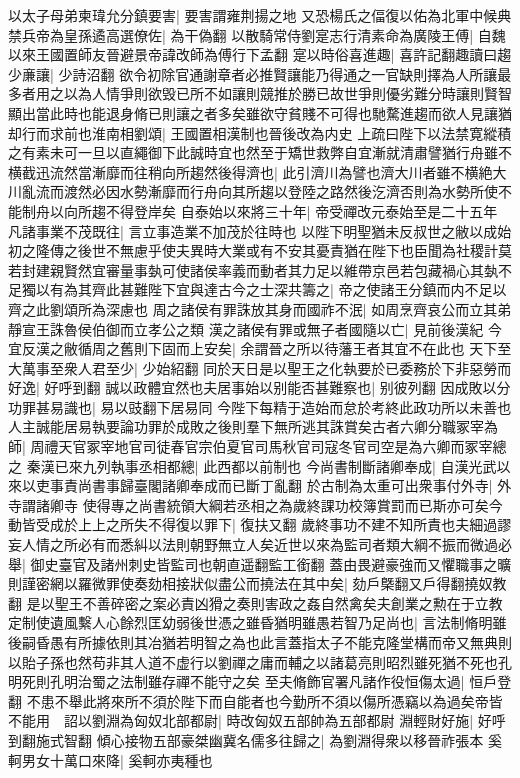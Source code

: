 以太子母弟柬瑋允分鎮要害|{
	要害謂雍荆揚之地}
又恐楊氏之偪復以佑為北軍中候典禁兵帝為皇孫遹高選僚佐|{
	為干偽翻}
以散騎常侍劉寔志行清素命為廣陵王傅|{
	自魏以來王國置師友晉避景帝諱改師為傅行下孟翻}
寔以時俗喜進趣|{
	喜許記翻趣讀曰趨}
少亷讓|{
	少詩沼翻}
欲令初除官通謝章者必推賢讓能乃得通之一官缺則擇為人所讓最多者用之以為人情爭則欲毁已所不如讓則競推於勝已故世爭則優劣難分時讓則賢智顯出當此時也能退身脩已則讓之者多矣雖欲守貧賤不可得也馳騖進趨而欲人見讓猶却行而求前也淮南相劉頌|{
	王國置相漢制也晉後改為内史}
上疏曰陛下以法禁寛縱積之有素未可一旦以直繩御下此誠時宜也然至于矯世救弊自宜漸就清肅譬猶行舟雖不横截迅流然當漸靡而往稍向所趨然後得濟也|{
	此引濟川為譬也濟大川者雖不横絶大川亂流而渡然必因水勢漸靡而行舟向其所趨以登陸之路然後汔濟否則為水勢所使不能制舟以向所趨不得登岸矣}
自泰始以來將三十年|{
	帝受禪改元泰始至是二十五年}
凡諸事業不茂既往|{
	言立事造業不加茂於往時也}
以陛下明聖猶未反叔世之敝以成始初之隆傳之後世不無慮乎使夫異時大業或有不安其憂責猶在陛下也臣聞為社稷計莫若封建親賢然宜審量事埶可使諸侯率義而動者其力足以維帶京邑若包藏禍心其埶不足獨以有為其齊此甚難陛下宜與達古今之士深共籌之|{
	帝之使諸王分鎮而内不足以齊之此劉頌所為深慮也}
周之諸侯有罪誅放其身而國祚不泯|{
	如周烹齊哀公而立其弟靜宣王誅魯侯伯御而立孝公之類}
漢之諸侯有罪或無子者國隨以亡|{
	見前後漢紀}
今宜反漢之敝循周之舊則下固而上安矣|{
	余謂晉之所以待藩王者其宜不在此也}
天下至大萬事至衆人君至少|{
	少始紹翻}
同於天日是以聖王之化執要於已委務於下非惡勞而好逸|{
	好呼到翻}
誠以政體宜然也夫居事始以别能否甚難察也|{
	别彼列翻}
因成敗以分功罪甚易識也|{
	易以豉翻下居易同}
今陛下每精于造始而怠於考終此政功所以未善也人主誠能居易執要論功罪於成敗之後則羣下無所逃其誅賞矣古者六卿分職冢宰為師|{
	周禮天官冢宰地官司徒春官宗伯夏官司馬秋官司寇冬官司空是為六卿而冢宰總之}
秦漢已來九列執事丞相都總|{
	此西都以前制也}
今尚書制斷諸卿奉成|{
	自漢光武以來以吏事責尚書事歸臺閣諸卿奉成而已斷丁亂翻}
於古制為太重可出衆事付外寺|{
	外寺謂諸卿寺}
使得專之尚書統領大綱若丞相之為歲終課功校簿賞罰而已斯亦可矣今動皆受成於上上之所失不得復以罪下|{
	復扶又翻}
歲終事功不建不知所責也夫細過謬妄人情之所必有而悉糾以法則朝野無立人矣近世以來為監司者類大綱不振而微過必舉|{
	御史臺官及諸州刺史皆監司也朝直遥翻監工銜翻}
蓋由畏避豪強而又懼職事之曠則謹密網以羅微罪使奏劾相接狀似盡公而撓法在其中矣|{
	劾戶槩翻又戶得翻撓奴教翻}
是以聖王不善碎密之案必責凶猾之奏則害政之姦自然禽矣夫創業之勲在于立教定制使遺風繫人心餘烈匡幼弱後世憑之雖昏猶明雖愚若智乃足尚也|{
	言法制脩明雖後嗣昏愚有所據依則其冶猶若明智之為也此言蓋指太子不能克隆堂構而帝又無典則以貽子孫也然苟非其人道不虚行以劉禪之庸而輔之以諸葛亮則昭烈雖死猶不死也孔明死則孔明治蜀之法制雖存禪不能守之矣}
至夫脩飾官署凡諸作役恒傷太過|{
	恒戶登翻}
不患不舉此將來所不須於陛下而自能者也今勤所不須以傷所憑竊以為過矣帝皆不能用　詔以劉淵為匈奴北部都尉|{
	時改匈奴五部帥為五部都尉}
淵輕財好施|{
	好呼到翻施式智翻}
傾心接物五部豪桀幽冀名儒多往歸之|{
	為劉淵得衆以移晉祚張本}
奚軻男女十萬口來降|{
	奚軻亦夷種也}


